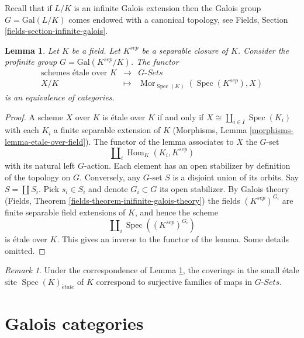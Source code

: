 \documentclass{stacks-project}
\theoremstyle{plain}
\newtheorem{lemma}[subsection]{Lemma}
\theoremstyle{definition}
\theoremstyle{remark}
\newtheorem{remark}[subsection]{Remark}
\numberwithin{equation}{subsection}
\def\Spec{\mathop{\mathrm{Spec}}}
\def\Hom{\mathop{\mathrm{Hom}}\nolimits}
\def\Mor{\mathop{\mathrm{Mor}}\nolimits}
\def\etale{{\acute{e}tale}}
\begin{document}
\medskip\noindent
Recall that if $L/K$ is an infinite Galois extension then the
Galois group $G = \text{Gal}(L/K)$ comes endowed with a canonical
topology, see Fields, Section \ref{fields-section-infinite-galois}.

\begin{lemma}
\label{lemma-sheaves-point}
Let $K$ be a field. Let $K^{sep}$ be a separable closure of $K$.
Consider the profinite group $G = \text{Gal}(K^{sep}/K)$.
The functor
$$
\begin{matrix}
\text{schemes \'etale over }K &
\longrightarrow &
G\textit{-Sets} \\
X/K & \longmapsto &
\Mor_{\Spec(K)}(\Spec(K^{sep}), X)
\end{matrix}
$$
is an equivalence of categories.
\end{lemma}

\begin{proof}
A scheme $X$ over $K$ is \'etale over $K$ if and only if
$X \cong \coprod_{i\in I} \Spec(K_i)$ with
each $K_i$ a finite separable extension of $K$
(Morphisms, Lemma \ref{morphisms-lemma-etale-over-field}).
The functor of the lemma associates to $X$ the $G$-set
$$
\coprod\nolimits_i \Hom_K(K_i, K^{sep})
$$
with its natural left $G$-action. Each element has an open stabilizer
by definition of the topology on $G$. Conversely, any $G$-set $S$
is a disjoint union of its orbits. Say $S = \coprod S_i$. Pick $s_i \in S_i$
and denote $G_i \subset G$ its open stabilizer. By Galois theory
(Fields, Theorem \ref{fields-theorem-inifinite-galois-theory})
the fields $(K^{sep})^{G_i}$ are finite separable field extensions of $K$, and
hence the scheme
$$
\coprod\nolimits_i \Spec((K^{sep})^{G_i})
$$
is \'etale over $K$. This gives an inverse to the functor of the lemma.
Some details omitted.
\end{proof}

\begin{remark}
\label{remark-covering-surjective}
Under the correspondence of Lemma \ref{lemma-sheaves-point},
the coverings in the small \'etale site
$\Spec(K)_\etale$ of $K$ correspond to surjective families of
maps in $G\textit{-Sets}$.
\end{remark}









\section{Galois categories}
\label{section-galois}
\end{document}
